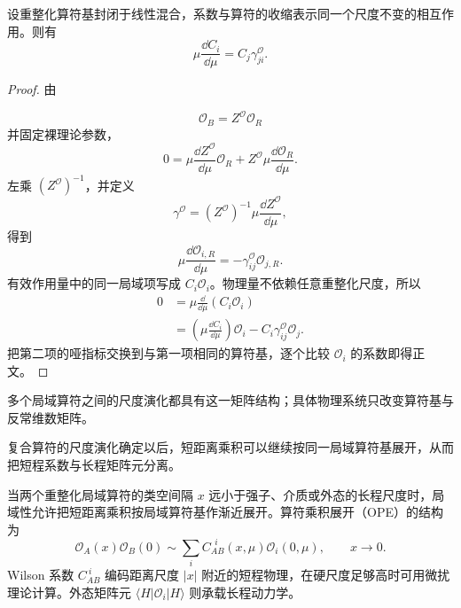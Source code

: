 \begin{proposition}[算符混合的对偶系数演化]
设重整化算符基封闭于线性混合，系数与算符的收缩表示同一个尺度不变的相互作用。则有
\begin{equation}
 {
 \mu\frac{\dd C_i}{\dd\mu}
 =C_j\gamma_{ji}^{\mathcal O}.}
\label{eq:wilson-rg-dp11}
\end{equation}
\end{proposition}
\begin{proof}
由

\begin{equation*}
 \mathcal O_B=Z^{\mathcal O}\mathcal O_R
\end{equation*}
并固定裸理论参数，
\begin{equation*}
 0=\mu\frac{\dd Z^{\mathcal O}}{\dd\mu}\mathcal O_R
 +Z^{\mathcal O}\mu\frac{\dd\mathcal O_R}{\dd\mu}.
\end{equation*}
左乘 $(Z^{\mathcal O})^{-1}$，并定义
\begin{equation*}
 \gamma^{\mathcal O}
 =(Z^{\mathcal O})^{-1}\mu\frac{\dd Z^{\mathcal O}}{\dd\mu},
\end{equation*}
得到
\begin{equation*}
 \mu\frac{\dd\mathcal O_{i,R}}{\dd\mu}
 =-\gamma_{ij}^{\mathcal O}\mathcal O_{j,R}.
\end{equation*}
有效作用量中的同一局域项写成 $C_i\mathcal O_i$。物理量不依赖任意重整化尺度，所以
\begin{align*}
 0
 &=\mu\frac{\dd}{\dd\mu}(C_i\mathcal O_i)\\
 &=\left(\mu\frac{\dd C_i}{\dd\mu}\right)\mathcal O_i
 -C_i\gamma_{ij}^{\mathcal O}\mathcal O_j.
\end{align*}
把第二项的哑指标交换到与第一项相同的算符基，逐个比较 $\mathcal O_i$ 的系数即得正文。
\end{proof}

多个局域算符之间的尺度演化都具有这一矩阵结构；具体物理系统只改变算符基与反常维数矩阵。

复合算符的尺度演化确定以后，短距离乘积可以继续按同一局域算符基展开，从而把短程系数与长程矩阵元分离。

当两个重整化局域算符的类空间隔 $x$ 远小于强子、介质或外态的长程尺度时，局域性允许把短距离乘积按局域算符基作渐近展开。算符乘积展开（OPE）的结构为
\begin{equation}
 {
 \mathcal O_A(x)\mathcal O_B(0)
 \sim\sum_i C_{AB}^{\ \ i}(x,\mu)\mathcal O_i(0,\mu),
 \qquad x\to0.}
 \label{eq:ope-general-dp11}
\end{equation}
Wilson 系数 $C_{AB}^{\ i}$ 编码距离尺度 $|x|$ 附近的短程物理，在硬尺度足够高时可用微扰理论计算。外态矩阵元 $\langle H|\mathcal O_i|H\rangle$ 则承载长程动力学。


